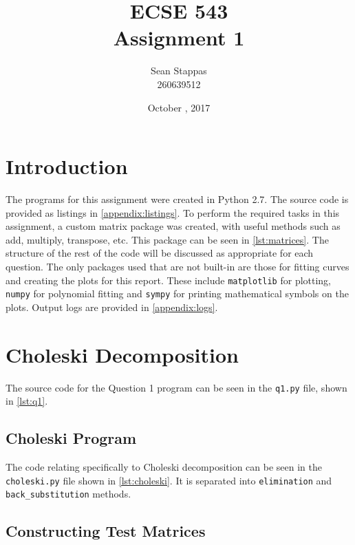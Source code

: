 \documentclass[a4paper,titlepage]{article}
\title{\textbf{ECSE 543 \\ Assignment 1}}
\author{Sean Stappas \\ 260639512}
\date{October \nth{21}, 2017}
\begin{document}
	\sloppy
	\maketitle
	
	\tableofcontents
	
	
	\twocolumn
	
	\section*{Introduction}
	
	The programs for this assignment were created in Python 2.7. The source code is provided as listings in \autoref{appendix:listings}. To perform the required tasks in this assignment, a custom matrix package was created, with useful methods such as add, multiply, transpose, etc. This package can be seen in \autoref{lst:matrices}. The structure of the rest of the code will be discussed as appropriate for each question. The only packages used that are not built-in are those for fitting curves and creating the plots for this report. These include \texttt{matplotlib} for plotting,  \texttt{numpy} for polynomial fitting and  \texttt{sympy} for printing mathematical symbols on the plots. Output logs are provided in \autoref{appendix:logs}.
	
	\section{Choleski Decomposition}
	
	The source code for the Question 1 program can be seen in the \texttt{q1.py} file, shown in \autoref{lst:q1}.
	
	\subsection{Choleski Program}
	
	The code relating specifically to Choleski decomposition can be seen in the \texttt{choleski.py} file shown in \autoref{lst:choleski}. It is separated into \texttt{elimination} and \texttt{back_substitution} methods.
	
	
	\subsection{Constructing Test Matrices}
	
\end{document}
